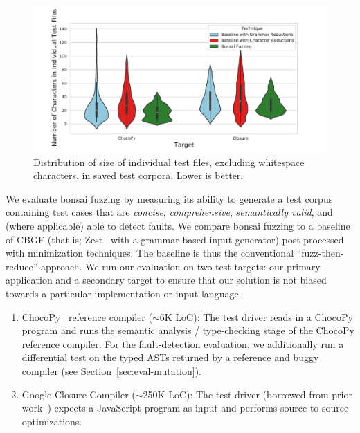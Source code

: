 \documentclass[conference]{IEEEtran}
\newcommand{\tech}{bonsai fuzzing} \newcommand{\Tech}{Bonsai fuzzing} \newcommand{\TECH}{Bonsai Fuzzing}
\begin{document}
\begin{figure}[ht]
    \centering
    \includegraphics[scale=0.5]{violin_chocopy.pdf}
    \caption{Distribution of size of individual test files, excluding whitespace characters, in saved test corpora. Lower is better.}
    \label{fig:test-size-violin}
\end{figure}
We evaluate \tech{} by measuring its ability to generate a test corpus containing test cases that are \textit{concise}, \textit{comprehensive}, \textit{semantically valid}, and (where applicable) able to detect faults. We compare \tech{} to a baseline of CBGF (that is; Zest~\cite{Padhye19-zest} with a grammar-based input generator) post-processed with minimization techniques. The baseline is thus the conventional ``fuzz-then-reduce'' approach. We run our evaluation on two test targets: our primary application and a secondary target to ensure that our solution is not biased towards a particular implementation or input language.

\noindent
\begin{enumerate}
    \item ChocoPy~\cite{ChocoPy} reference compiler ($\sim$6K LoC): The test driver reads in a ChocoPy program and runs the semantic analysis / type-checking stage of the ChocoPy reference compiler. For the fault-detection evaluation, we additionally run a differential test on the typed ASTs returned by a reference and buggy compiler (see Section~\ref{sec:eval-mutation}).
    \item Google Closure Compiler\cite{Closure} ($\sim$250K LoC): The test driver (borrowed from prior work~\cite{Padhye19-zest}) expects a JavaScript program as input and performs source-to-source optimizations.
\end{enumerate}
\end{document}
